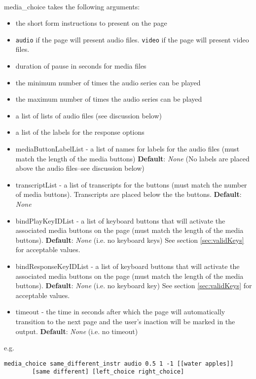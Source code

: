 \paragraph{}
media\_choice takes the following arguments:

\begin{itemize}
\item the short form instructions to present on the page
\item \texttt{audio} if the page will present audio files.  \texttt{video} if the page will present video files.
\item duration of pause in seconds for media files
\item the minimum number of times the audio series can be played
\item the maximum number of times the audio series can be played
\item a list of lists of audio files (see discussion below)
\item a list of the labels for the response options
\item mediaButtonLabelList - a list of names for labels for the audio files (must match the length of the media buttons) \textbf{Default}: \textit{None} (No labels are placed above the audio files--see discussion below)
\item transcriptList - a list of transcripts for the buttons (must match the number of media buttons).  Transcripts are placed below the the buttons.  \textbf{Default}: \textit{None}
\item bindPlayKeyIDList -  a list of keyboard buttons that will activate the associated media buttons on the page (must match the length of the media buttons).  \textbf{Default}: \textit{None} (i.e. no keyboard keys)  See section \ref{sec:validKeys} for acceptable values.
\item bindResponseKeyIDList - a list of keyboard buttons that will activate the associated media buttons on the page (must match the length of the media buttons).  \textbf{Default}: \textit{None} (i.e. no keyboard key)  See section \ref{sec:validKeys} for acceptable values.
\item timeout - the time in seconds after which the page will automatically transition to the next page and the user's inaction will be marked in the output.  \textbf{Default}: \textit{None} (i.e. no timeout)
\end{itemize}

e.g.
\begin{lstlisting}
media_choice same_different_instr audio 0.5 1 -1 [[water apples]]
		[same different] [left_choice right_choice]
\end{lstlisting}

